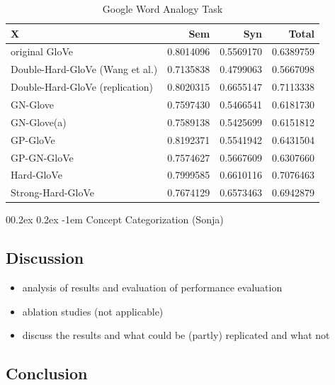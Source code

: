 \documentclass[
  english,
  man,floatsintext]{apa6}
\makeatletter
\providecommand{\tightlist}{%
  \setlength{\itemsep}{0pt}\setlength{\parskip}{0pt}}
\let\oldparagraph\paragraph
\renewcommand{\paragraph}[1]{\oldparagraph{#1}\mbox{}}
\renewcommand{\paragraph}{\@startsection{paragraph}{4}{\parindent}%
  {0\baselineskip \@plus 0.2ex \@minus 0.2ex}%
  {-1em}%
  {\normalfont\normalsize\bfseries\itshape\typesectitle}}
\makeatother
\begin{document}
\begin{table}

\caption{\label{tab:unnamed-chunk-5}Google Word Analogy Task}
\centering
\begin{tabular}[t]{l|r|r|r}
\hline
X & Sem & Syn & Total\\
\hline
original GloVe & 0.8014096 & 0.5569170 & 0.6389759\\
\hline
Double-Hard-GloVe (Wang et al.) & 0.7135838 & 0.4799063 & 0.5667098\\
\hline
Double-Hard-GloVe (replication) & 0.8020315 & 0.6655147 & 0.7113338\\
\hline
GN-Glove & 0.7597430 & 0.5466541 & 0.6181730\\
\hline
GN-Glove(a) & 0.7589138 & 0.5425699 & 0.6151812\\
\hline
GP-GloVe & 0.8192371 & 0.5541942 & 0.6431504\\
\hline
GP-GN-GloVe & 0.7574627 & 0.5667609 & 0.6307660\\
\hline
Hard-GloVe & 0.7999585 & 0.6610116 & 0.7076463\\
\hline
Strong-Hard-GloVe & 0.7674129 & 0.6573463 & 0.6942879\\
\hline
\end{tabular}
\end{table}

\hypertarget{concept-categorization-sonja}{%
\paragraph{Concept Categorization (Sonja)}\label{concept-categorization-sonja}}

\hypertarget{discussion}{%
\subsection{Discussion}\label{discussion}}

\begin{itemize}
\tightlist
\item
  analysis of results and evaluation of performance evaluation
\item
  ablation studies (not applicable)
\item
  discuss the results and what could be (partly) replicated and what not
\end{itemize}

\hypertarget{conclusion}{%
\subsection{Conclusion}\label{conclusion}}
\end{document}
